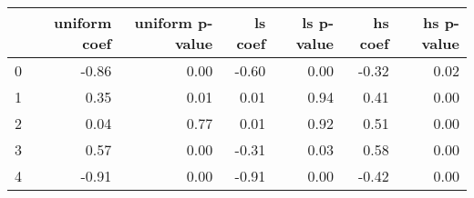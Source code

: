 \begin{tabular}{lrrrrrr}
\toprule
 & uniform coef & uniform p-value & ls coef & ls p-value & hs coef & hs p-value \\
\midrule
0 & -0.86 & 0.00 & -0.60 & 0.00 & -0.32 & 0.02 \\
1 & 0.35 & 0.01 & 0.01 & 0.94 & 0.41 & 0.00 \\
2 & 0.04 & 0.77 & 0.01 & 0.92 & 0.51 & 0.00 \\
3 & 0.57 & 0.00 & -0.31 & 0.03 & 0.58 & 0.00 \\
4 & -0.91 & 0.00 & -0.91 & 0.00 & -0.42 & 0.00 \\
\bottomrule
\end{tabular}
